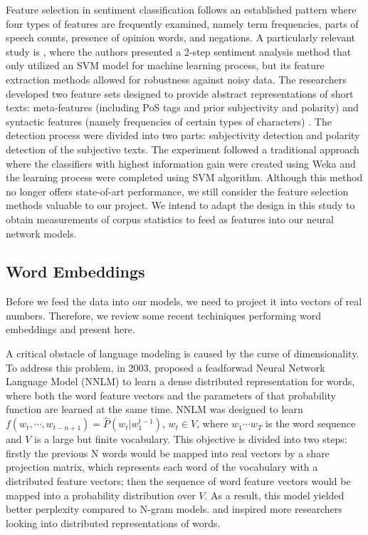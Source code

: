 \documentclass[12pt]{diazessay} %
\begin{document}
 Feature selection in sentiment classification follows an established pattern where four types of features are frequently examined, namely term frequencies, parts of speech counts, presence of opinion words, and negations\citep{medhat2014}. A particularly relevant study is \citep{barbosa2010}, where the authors presented a 2-step sentiment analysis method that only utilized an SVM model for machine learning process, but its feature extraction methods allowed for robustness against noisy data. The researchers developed two feature sets designed to provide abstract representations of short texts: meta-features (including PoS tags and prior subjectivity and polarity) and syntactic features (namely frequencies of certain types of characters) \citep{barbosa2010}. The detection process were divided into two parts: subjectivity detection and polarity detection of the subjective texts. The experiment followed a traditional approach where the classifiers with highest information gain were created using Weka and the learning process were completed using SVM algorithm\citep{barbosa2010}. Although this method no longer offers state-of-art performance, we still consider the feature selection methods valuable to our project. We intend to adapt the design in this study to obtain measurements of corpus statistics to feed as features into our neural network models. 

\subsection{Word Embeddings}
Before we feed the data into our models, we need to project it into vectors of real numbers. Therefore, we review some recent techiniques performing word embeddings and present here.

A critical obstacle of language modeling is caused by the curse of dimensionality. To address this problem, in 2003, \citep{bengio2003neural} proposed a feadforwad Neural Network Language Model (NNLM) to learn a dense distributed representation\citep{hinton1986learning} for words, where both the word feature vectors and the parameters of that probability function are learned at the same time. NNLM was designed to learn $f \left( w _ { t } , \cdots , w _ { t - n + 1 } \right) = \hat { P } \left( w _ { t } | w _ { 1 } ^ { t - 1 } \right)$, $w _ { t } \in V$, where $w_1 \cdots w_T$ is the word sequence and $V$ is a large but finite vocabulary. This objective is divided into two steps: firstly the previous N words would be mapped into real vectors by a share projection matrix, which represents each word of the vocabulary with a distributed feature vectors; then the sequence of word feature vectors would be mapped into a probability distribution over $V$. As a result, this model yielded better perplexity compared to N-gram models. and inspired more researchers looking into distributed representations of words.
\end{document}
